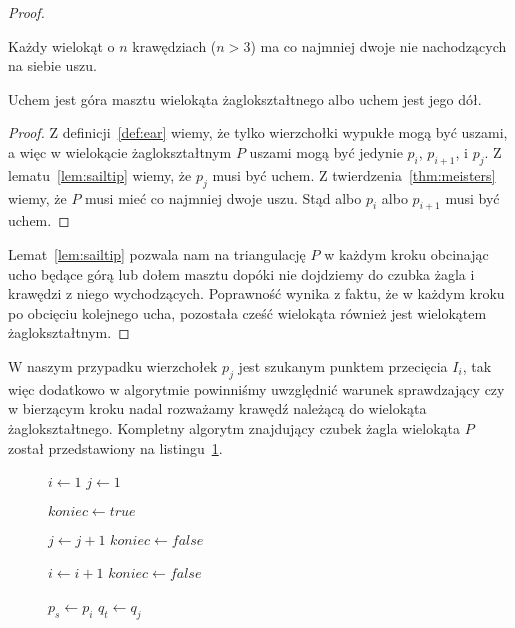 \begin{proof}
  \begin{twierdzenie}[G.H. Meisters 1975]\label{thm:meisters}
    Każdy wielokąt o $n$ krawędziach ($n > 3$) ma co najmniej dwoje nie
    nachodzących na siebie uszu.
  \end{twierdzenie}

  \begin{lemat}\label{lem:sailmast}
    Uchem jest góra masztu wielokąta żaglokształtnego albo uchem jest
    jego dół.
  \end{lemat}

  \begin{proof}
    Z definicji~\ref{def:ear} wiemy, że tylko wierzchołki wypukłe mogą
    być uszami, a więc w wielokącie żaglokształtnym $P$ uszami mogą
    być jedynie $p_i$, $p_{i+1}$, i $p_j$. Z lematu~\ref{lem:sailtip}
    wiemy, że $p_j$ musi być uchem. Z twierdzenia~\ref{thm:meisters}
    wiemy, że $P$ musi mieć co najmniej dwoje uszu. Stąd albo $p_i$
    albo $p_{i+1}$ musi być uchem.
  \end{proof}

  Lemat~\ref{lem:sailtip} pozwala nam na triangulację $P$ w każdym
  kroku obcinając ucho będące górą lub dołem masztu dopóki nie
  dojdziemy do czubka żagla i krawędzi z niego
  wychodzących. Poprawność wynika z faktu, że w każdym kroku po
  obcięciu kolejnego ucha, pozostała cześć wielokąta również jest
  wielokątem żaglokształtnym.
\end{proof}

W naszym przypadku wierzchołek $p_j$ jest szukanym punktem przecięcia
$I_i$, tak więc dodatkowo w algorytmie powinniśmy uwzględnić warunek
sprawdzający czy w bierzącym kroku nadal rozważamy krawędź należącą do
wielokąta żaglokształtnego. Kompletny algorytm znajdujący czubek żagla
wielokąta $P$ został przedstawiony na listingu~\ref{alg:stepdown}.

\begin{figure}[htp]
\begin{algorithmic}[1]

\State $i \gets 1$
\State $j \gets 1$


\Repeat
\State $koniec \gets true$


\State $j \gets j + 1$
\State $koniec \gets false$
\EndWhile


\State $i \gets i + 1$
\State $koniec \gets false$
\EndWhile



\State $p_s \gets p_i$
\State $q_t \gets q_j$

\EndProcedure
\end{algorithmic}
\caption{\label{alg:stepdown}}
\end{figure}

